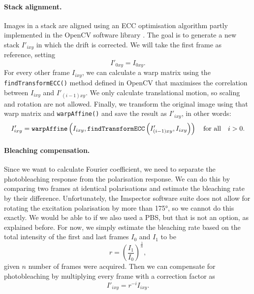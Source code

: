 \paragraph{Stack alignment.} Images in a stack are aligned using an ECC optimisation algorithm partly implemented in the OpenCV software library \cite{Evangelidis2008}. The goal is to generate a new stack $ I'_{ixy} $ in which the drift is corrected. We will take the first frame as reference, setting 
\begin{equation}
	I'_{0xy} = I_{0xy}.
\end{equation}
For every other frame $ I_{ixy} $, we can calculate a warp matrix using the \texttt{findTransformECC()} method defined in OpenCV that maximises the correlation between $ I_{ixy} $ and $ I'_{(i-1)xy} $. We only calculate translational motion, so scaling and rotation are not allowed. Finally, we transform the original image using that warp matrix and \texttt{warpAffine()} and save the result as $ I'_{ixy} $, in other words:
\begin{equation}
	I'_{ixy} = \texttt{warpAffine}\left(
		I_{ixy}, 
		\texttt{findTransformECC}\left(I'_{(i-1)xy}, I_{ixy}\right)
	\right) \qq{for all} i>0.
\end{equation}

\paragraph{Bleaching compensation.} Since we want to calculate Fourier coefficient, we need to separate the photobleaching response from the polarisation response. We can do this by comparing two frames at identical polarisations and estimate the bleaching rate by their difference. Unfortunately, the Imspector software suite does not allow for rotating the excitation polarisation by more than \ang{175}, so we cannot do this exactly. We would be able to if we also used a PBS, but that is not an option, as explained before. For now, we simply estimate the bleaching rate based on the total intensity of the first and last frames $ I_0 $ and $ I_1 $ to be
\begin{equation}
	r = \left( \frac{I_1}{I_0} \right)^\frac{1}{n},
\end{equation}
given $ n $ number of frames were acquired. Then we can compensate for photobleaching by multiplying every frame with a correction factor as
\begin{equation}
	I'_{ixy} = r^{-i} I_{ixy}.
\end{equation}

